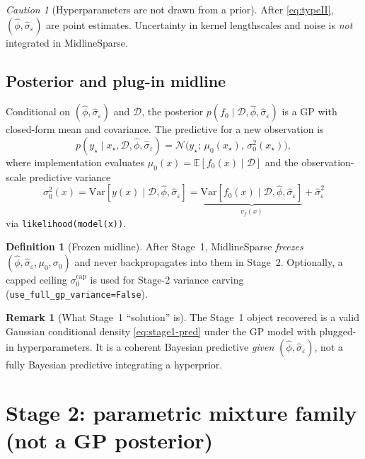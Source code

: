 \documentclass[11pt,a4paper]{article}
\theoremstyle{plain}
\theoremstyle{definition}
\newtheorem{definition}[theorem]{Definition}
\newtheorem{remark}[theorem]{Remark}
\theoremstyle{remark}
\newtheorem{caution}[theorem]{Caution}
\newcommand{\E}{\mathbb{E}}
\newcommand{\Var}{\mathrm{Var}}
\newcommand{\Ncal}{\mathcal{N}}
\newcommand{\D}{\mathcal{D}}
\begin{document}
\begin{caution}[Hyperparameters are not drawn from a prior]
After \eqref{eq:typeII}, \((\hat\phi,\hat\sigma_\varepsilon)\) are point estimates.
Uncertainty in kernel lengthscales and noise is \emph{not} integrated in MidlineSparse.
\end{caution}

\subsection{Posterior and plug-in midline}
Conditional on \((\hat\phi,\hat\sigma_\varepsilon)\) and \(\D\), the posterior
\(p(f_0\mid\D,\hat\phi,\hat\sigma_\varepsilon)\) is a GP with closed-form mean and
covariance. The predictive for a new observation is
\begin{equation}
  p(y_\star\mid x_\star,\D,\hat\phi,\hat\sigma_\varepsilon)
  =
  \Ncal\!\bigl(y_\star;\,\mu_0(x_\star),\,\sigma_0^2(x_\star)\bigr),
  \label{eq:stage1-pred}
\end{equation}
where implementation evaluates
\(\mu_0(x)=\E[f_0(x)\mid\D]\) and the observation-scale predictive variance
\[
  \sigma_0^2(x)
  =
  \Var[y(x)\mid\D,\hat\phi,\hat\sigma_\varepsilon]
  =
  \underbrace{\Var[f_0(x)\mid\D,\hat\phi,\hat\sigma_\varepsilon]}_{v_f(x)}
  +
  \hat\sigma_\varepsilon^2
\]
via \texttt{likelihood(model(x))}.

\begin{definition}[Frozen midline]
After Stage~1, MidlineSparse \emph{freezes}
\((\hat\phi,\hat\sigma_\varepsilon,\mu_0,\sigma_0)\) and never backpropagates into them
in Stage~2. Optionally, a capped ceiling \(\sigma_0^{\mathrm{cap}}\) is used for
Stage-2 variance carving (\texttt{use\_full\_gp\_variance=False}).
\end{definition}

\begin{remark}[What Stage~1 ``solution'' is]
The Stage~1 object recovered is a valid Gaussian conditional density
\eqref{eq:stage1-pred} under the GP model with plugged-in hyperparameters.
It is a coherent Bayesian predictive \emph{given} \((\hat\phi,\hat\sigma_\varepsilon)\),
not a fully Bayesian predictive integrating a hyperprior.
\end{remark}

\section{Stage 2: parametric mixture family (not a GP posterior)}
\label{sec:stage2}
\end{document}
